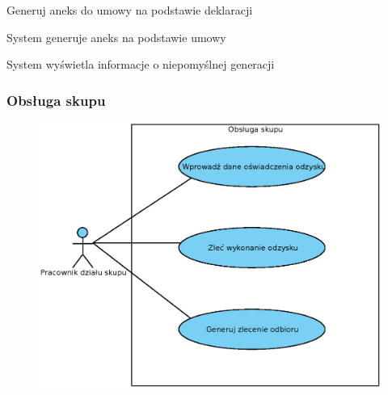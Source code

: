 	\begin{usecase}{Generuj aneks do umowy na podstawie deklaracji}
		\author{Dawid Suder}
		\maketitle
		\begin{scenario}
			\begin{enumerate}
				 System generuje aneks na podstawie umowy
			\end{enumerate}
		\end{scenario}
		\begin{extensions}
			\begin{enumerate}
			 System wyświetla informacje o niepomyślnej generacji
			\end{enumerate}
		\end{extensions}
\end{usecase}

\subsubsection{Obsługa skupu}

	\begin{figure}[H]
		\centering
		\includegraphics[width=.8\textwidth]{img/UC/skup.eps}
	\end{figure}

